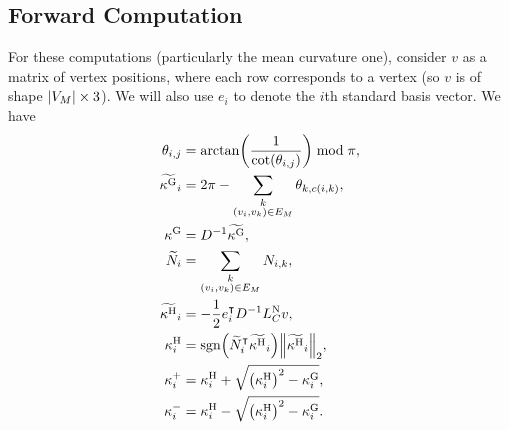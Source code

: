 \subsection{Forward Computation}
For these computations (particularly the mean curvature one), consider \(v\) as a matrix of vertex positions, where each row corresponds to a vertex (so \(v\) is of shape \(\abs{V_M} \times 3\)). We will also use \(e_i\) to denote the \(i\)th standard basis vector. We have \begin{align*}
	\theta_{i, j} &= \arctan\pof{\frac{1}{\cot\pof{\theta_{i, j}}}} \bmod \pi, \\
	\widetilde{\kappa^\text{G}}_i &= 2\pi - \sum_{\substack{k \\ \pof{v_i, v_k} \in E_M}} \theta_{k, c\pof{i, k}}, \\
	\kappa^\text{G} &= D^{-1}\widetilde{\kappa^\text{G}}, \\
	\widetilde{N}_i &= \sum_{\substack{k \\ \pof{v_i, v_k} \in E_M}} N_{i, k}, \\
	\widetilde{\kappa^\text{H}}_i &= -\frac{1}{2}e_i^\intercal D^{-1}L_C^{\text{N}}v, \\
	\kappa^\text{H}_i &= \sgn\pof{\widetilde{N}_i^\intercal\widetilde{\kappa^\text{H}}_i}\norm{\widetilde{\kappa^\text{H}}_i}_2, \\
	\kappa^+_i &= \kappa^{\text{H}}_i + \sqrt{\pof{\kappa^{\text{H}}_i}^2 - \kappa^{\text{G}}_i}, \\
	\kappa^-_i &= \kappa^{\text{H}}_i - \sqrt{\pof{\kappa^{\text{H}}_i}^2 - \kappa^{\text{G}}_i}.
\end{align*}

